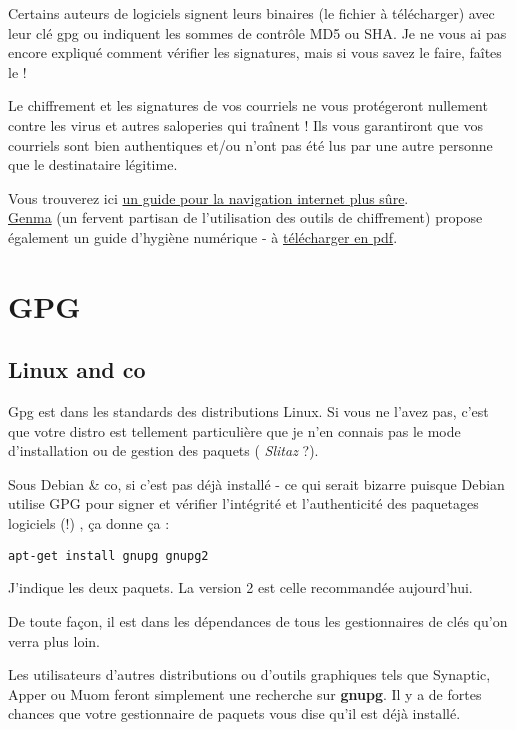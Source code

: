 Certains auteurs de logiciels signent leurs binaires (le fichier à
télécharger) avec leur clé gpg ou indiquent les sommes de contrôle MD5
ou SHA. Je ne vous ai pas encore expliqué comment vérifier les
signatures, mais si vous savez le faire, faîtes le !

Le chiffrement et les signatures de vos courriels ne vous protégeront
nullement contre les virus et autres saloperies qui traînent ! Ils vous
garantiront que vos courriels sont bien authentiques et/ou n'ont pas été
lus par une autre personne que le destinataire légitime.

Vous trouverez ici
\href{http://sanspseudofix.fr/kit-de-base-du-surf-tranquille-2/}{un
guide pour la navigation internet plus
sûre}.\\\href{http://genma.free.fr/?Petit-guide-d-hygiene-numerique}{Genma}
(un fervent partisan de l'utilisation des outils de chiffrement) propose
également un guide d'hygiène numérique - à
\href{https://github.com/genma/Conference_Guide_d_hygiene_numerique/blob/master/Genma_Petit_Guide_d_hygiene_numerique.pdf?raw=true}{télécharger
en pdf}.

\section{GPG}\label{gpg}

\subsection{Linux and co}\label{linux-and-co}

Gpg est dans les standards des distributions Linux. Si vous ne l'avez
pas, c'est que votre distro est tellement particulière que je n'en
connais pas le mode d'installation ou de gestion des paquets (
\emph{Slitaz} ?).

Sous Debian \& co, si c'est pas déjà installé - ce qui serait bizarre
puisque Debian utilise GPG pour signer et vérifier l'intégrité et
l'authenticité des paquetages logiciels (!) , ça donne ça :

\begin{verbatim}
apt-get install gnupg gnupg2
\end{verbatim}

J'indique les deux paquets. La version 2 est celle recommandée
aujourd'hui.

De toute façon, il est dans les dépendances de tous les gestionnaires de
clés qu'on verra plus loin.

Les utilisateurs d'autres distributions ou d'outils graphiques tels que
Synaptic, Apper ou Muom feront simplement une recherche sur
\textbf{gnupg}. Il y a de fortes chances que votre gestionnaire de
paquets vous dise qu'il est déjà installé.

